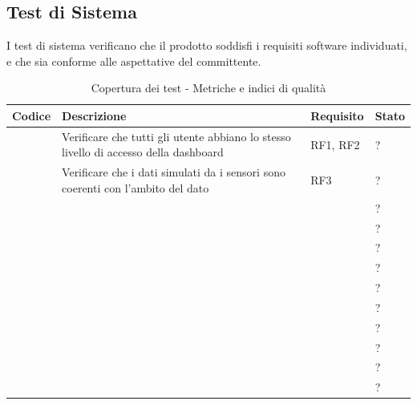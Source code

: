 \subsection{Test di Sistema}

I test di sistema verificano che il prodotto soddisfi i requisiti software individuati, e che sia conforme alle aspettative del committente. %

\setcounter{TestdiSistema}{1}
\begin{table}[H]
    \centering
    \begin{tabular}{|C{1.5cm}|C{7cm}|C{2.5cm}|C{2.5cm}|}
        \hline
        \textbf{Codice} & \textbf{Descrizione} & \textbf{Requisito} & \textbf{Stato} \\
        \hline
        \textbf{} & Verificare che tutti gli utente abbiano lo stesso livello di accesso della dashboard & RF1, RF2 & ? \\
        \hline
        \textbf{} & Verificare che i dati simulati da i sensori sono coerenti con l'ambito del dato & RF3 & ? \\
        \hline
        \textbf{} &  &  & ? \\
        \hline
        \textbf{} &  &  & ? \\
        \hline
        \textbf{} &  &  & ? \\
        \hline
        \textbf{} &  &  & ? \\
        \hline
        \textbf{} &  &  & ? \\
        \hline
        \textbf{} &  &  & ? \\
        \hline
        \textbf{} &  &  & ? \\
        \hline
        \textbf{} &  &  & ? \\
        \hline
        \textbf{} &  &  & ? \\
        \hline
        \textbf{} &  &  & ? \\
        \hline
    \end{tabular}
    \caption{Copertura dei test - Metriche e indici di qualità}
    \label{tab:test_di_sistema}
\end{table}
